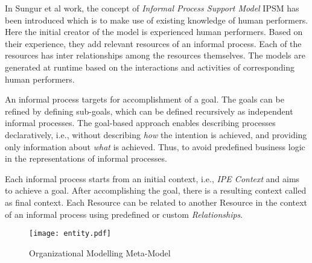  In Sungur et al \cite{Sungur2014a} work, the concept of \textit{Informal Process Support Model} IPSM has been introduced which is to make use of existing knowledge of human performers. Here the initial creator of the model is experienced human performers. Based on their experience, they add relevant  resources of an informal process. Each of the resources has inter relationships among the resources themselves. The models are generated at runtime based on the interactions and activities of corresponding human performers. 

 An informal process targets for accomplishment of a goal. The goals can be refined by defining sub-goals, which can be defined recursively as independent informal processes. The goal-based approach enables describing processes declaratively, i.e., without describing \textit{how} the intention is achieved, and providing only information about \textit{what} is achieved. Thus, to avoid predefined business logic in the representations of informal processes. 

 Each informal process starts from an initial context, i.e., \textit{IPE Context} and aims to achieve a goal. After accomplishing the goal, there is a resulting context called as final context. Each Resource can be related to another Resource in the context of an informal process using predefined or custom \textit{Relationships}.
 
 \begin{figure}
 	\centering
 	\texttt{[image: entity.pdf]}
 	\caption{Organizational Modelling Meta-Model}
 	\label{fig:metamodel}
 \end{figure}
 


